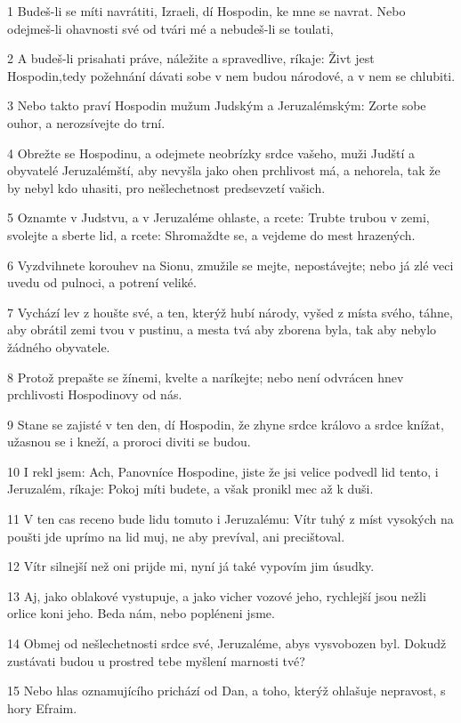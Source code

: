 \par 1 Budeš-li se míti navrátiti, Izraeli, dí Hospodin, ke mne se navrat. Nebo odejmeš-li ohavnosti své od tvári mé a nebudeš-li se toulati,
\par 2 A budeš-li prisahati práve, náležite a spravedlive, ríkaje: Živt jest Hospodin,tedy požehnání dávati sobe v nem budou národové, a v nem se chlubiti.
\par 3 Nebo takto praví Hospodin mužum Judským a Jeruzalémským: Zorte sobe ouhor, a nerozsívejte do trní.
\par 4 Obrežte se Hospodinu, a odejmete neobrízky srdce vašeho, muži Judští a obyvatelé Jeruzalémští, aby nevyšla jako ohen prchlivost má, a nehorela, tak že by nebyl kdo uhasiti, pro nešlechetnost predsevzetí vašich.
\par 5 Oznamte v Judstvu, a v Jeruzaléme ohlaste, a rcete: Trubte trubou v zemi, svolejte a sberte lid, a rcete: Shromaždte se, a vejdeme do mest hrazených.
\par 6 Vyzdvihnete korouhev na Sionu, zmužile se mejte, nepostávejte; nebo já zlé veci uvedu od pulnoci, a potrení veliké.
\par 7 Vychází lev z houšte své, a ten, kterýž hubí národy, vyšed z místa svého, táhne, aby obrátil zemi tvou v pustinu, a mesta tvá aby zborena byla, tak aby nebylo žádného obyvatele.
\par 8 Protož prepašte se žínemi, kvelte a naríkejte; nebo není odvrácen hnev prchlivosti Hospodinovy od nás.
\par 9 Stane se zajisté v ten den, dí Hospodin, že zhyne srdce královo a srdce knížat, užasnou se i kneží, a proroci diviti se budou.
\par 10 I rekl jsem: Ach, Panovníce Hospodine, jiste že jsi velice podvedl lid tento, i Jeruzalém, ríkaje: Pokoj míti budete, a však pronikl mec až k duši.
\par 11 V ten cas receno bude lidu tomuto i Jeruzalému: Vítr tuhý z míst vysokých na poušti jde uprímo na lid muj, ne aby prevíval, ani precištoval.
\par 12 Vítr silnejší než oni prijde mi, nyní já také vypovím jim úsudky.
\par 13 Aj, jako oblakové vystupuje, a jako vicher vozové jeho, rychlejší jsou nežli orlice koni jeho. Beda nám, nebo popléneni jsme.
\par 14 Obmej od nešlechetnosti srdce své, Jeruzaléme, abys vysvobozen byl. Dokudž zustávati budou u prostred tebe myšlení marnosti tvé?
\par 15 Nebo hlas oznamujícího prichází od Dan, a toho, kterýž ohlašuje nepravost, s hory Efraim.
